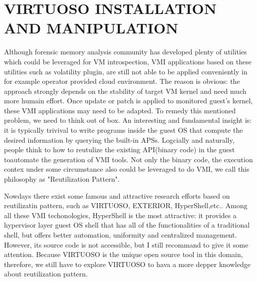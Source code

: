 
\chapter{VIRTUOSO INSTALLATION AND MANIPULATION} %

\label{Chapter8} %


Although forensic memory analysis community has developed plenty of utilities which could be leveraged for VM introspection, 
VMI applications based on these utilities such as volatility plugin, are still not able to be applied conveniently in for example 
operator provided cloud environment. The reason is obvious: the approach strongly depends on the stability of target VM kernel and need much
more humain effort. Once update or patch is applied to monitored guest’s kernel, these VMI applications may need to be adapted. To remedy this 
mentioned problem, we need to think out of box. An interesting and fundamental insight is: it is typically trivival to write programs inside 
the guest OS that compute the desired information by querying the built-in APSs. Logcially and naturally, people think to how to reutulize 
the existing API(binary code) in the guest toautomate the generation of VMI tools. Not only the binary code, the execution contex under some
circumstance also could be leveraged to do VMI, we call this philosophy as "Reutilization Pattern". 

Nowdays there exist some famous and attractive research efforts based on reutilizatin pattern, such as VIRTUOSO\cite{Reference27}, 
EXTERIOR\cite{Reference29}, HyperShell\cite{Reference31},etc.. Among all these VMI techonologies, HyperShell is the most attractive: it provides
a hypervisor layer guest OS shell that has all of the functionalities of a traditional shell, but offers better automation, uniformity and 
centralized management. However, its source code is not accessible, but I still recommand to give it some attention.
Because VIRTUOSO is the unique open source tool in this domain, therefore, we still have to  explore VIRTUOSO to hava a more depper
knowledge about reutilization pattern.



